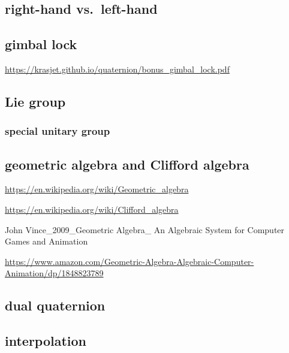 \documentclass[
]{book}
\theoremstyle{definition}
\theoremstyle{definition}
\theoremstyle{definition}
\theoremstyle{definition}
\theoremstyle{remark}
\begin{document}
\hypertarget{right-hand-vs.-left-hand}{%
\subsection{right-hand vs.~left-hand}\label{right-hand-vs.-left-hand}}

\hypertarget{gimbal-lock}{%
\subsection{gimbal lock}\label{gimbal-lock}}

\url{https://krasjet.github.io/quaternion/bonus_gimbal_lock.pdf}

\hypertarget{lie-group}{%
\subsection{Lie group}\label{lie-group}}

\hypertarget{special-unitary-group}{%
\subsubsection{special unitary group}\label{special-unitary-group}}

\hypertarget{geometric-algebra-and-clifford-algebra}{%
\subsection{geometric algebra and Clifford algebra}\label{geometric-algebra-and-clifford-algebra}}

\url{https://en.wikipedia.org/wiki/Geometric_algebra}

\url{https://en.wikipedia.org/wiki/Clifford_algebra}

John Vince\_2009\_Geometric Algebra\_ An Algebraic System for Computer Games and Animation

\url{https://www.amazon.com/Geometric-Algebra-Algebraic-Computer-Animation/dp/1848823789}

\hypertarget{dual-quaternion}{%
\subsection{dual quaternion}\label{dual-quaternion}}

\hypertarget{interpolation}{%
\subsection{interpolation}\label{interpolation}}
\end{document}
